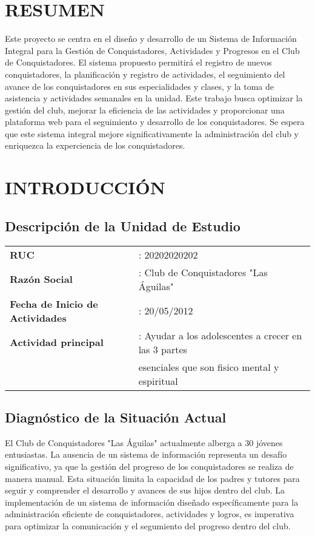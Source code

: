 \documentclass[stu, 12pt, letterpaper, donotrepeattitle, floatsintext, natbib]{apa7}
\begin{document}
\section{\large RESUMEN}
Este proyecto se centra en el dise\~{n}o y desarrollo de un Sistema de
Informaci\'on Integral para la Gesti\'on de Conquistadores, Actividades y
Progresos en el Club de Conquistadores. El sistema propuesto permitir\'a el
registro de nuevos conquistadores, la planificaci\'on y registro de
actividades, el seguimiento del avance de los conquistadores en sus
especialidades y clases, y la toma de asistencia y actividades semanales en la
unidad. Este trabajo busca optimizar la gesti\'on del club, mejorar la
eficiencia de las actividades y proporcionar una plataforma web para el
seguimiento y desarrollo de los conquistadores. Se espera que este sistema
integral mejore significativamente la administraci\'on del club y enriquezca la
experciencia de los conquistadores.

\section{\large INTRODUCCI\'ON}

\subsection{Descripci\'on de la Unidad de Estudio}
\begin{tabular}{ll}
    \textbf{RUC}                            & : 20202020202                                        \\
    \textbf{Raz\'on Social}                 & : Club de Conquistadores "Las \'Aguilas"             \\
    \textbf{Fecha de Inicio de Actividades} & : 20/05/2012                                         \\
    \textbf{Actividad principal}            & : Ayudar a los adolescentes a crecer en las 3 partes \\            & esenciales que son fisico mental y espiritual
\end{tabular}

\subsection{Diagn\'ostico de la Situaci\'on Actual}
El Club de Conquistadores "Las \'Aguilas" actualmente alberga a 30 j\'ovenes
entusiastas. La ausencia de un sistema de informaci\'on representa un desaf\'io
significativo, ya que la gesti\'on del progreso de los conquistadores se
realiza de manera manual. Esta situaci\'on limita la capacidad de los padres y
tutores para seguir y comprender el desarrollo y avances de sus hijos dentro
del club. La implementaci\'on de un sistema de informaci\'on dise\~{n}ado
espec\'ificamente para la administraci\'on eficiente de conquistadores,
actividades y logros, es imperativa para optimizar la comunicaci\'on y el
segumiento del progreso dentro del club.
\end{document}
